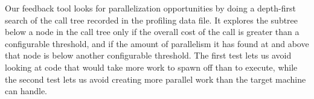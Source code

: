 

Our feedback tool looks for parallelization opportunities
by doing a depth-first search
of the call tree recorded in the profiling data file.
It explores the subtree below a node in the call tree
only if the overall cost of the call
is greater than a configurable threshold,
and if the amount of parallelism it has found at and above that node
is below another configurable threshold.
The first test lets us avoid looking at code
that would take more work to spawn off than to execute,
while the second test lets us avoid creating
more parallel work than the target machine can handle.

